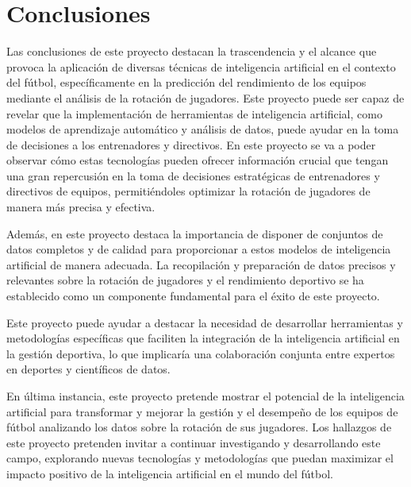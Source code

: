 



\section{Conclusiones}
Las conclusiones de este proyecto destacan la trascendencia y el alcance que provoca la aplicación de diversas técnicas de inteligencia artificial en el contexto del fútbol, específicamente en la predicción del rendimiento de los equipos mediante el análisis de la rotación de jugadores. Este proyecto puede ser capaz de revelar que la implementación de herramientas de inteligencia artificial, como modelos de aprendizaje automático y análisis de datos, puede ayudar en la toma de decisiones a los entrenadores y directivos. En este proyecto se va a poder observar cómo estas tecnologías pueden ofrecer información crucial que tengan una gran repercusión en la toma de decisiones estratégicas de entrenadores y directivos de equipos, permitiéndoles optimizar la rotación de jugadores de manera más precisa y efectiva.

Además, en este proyecto destaca la importancia de disponer de conjuntos de datos completos y de calidad para proporcionar a estos modelos de inteligencia artificial de manera adecuada. La recopilación y preparación de datos precisos y relevantes sobre la rotación de jugadores y el rendimiento deportivo se ha establecido como un componente fundamental para el éxito de este proyecto. 

Este proyecto puede ayudar a destacar la necesidad de desarrollar herramientas y metodologías específicas que faciliten la integración de la inteligencia artificial en la gestión deportiva, lo que implicaría una colaboración conjunta entre expertos en deportes y científicos de datos.

En última instancia, este proyecto pretende mostrar el potencial de la inteligencia artificial para transformar y mejorar la gestión y el desempeño de los equipos de fútbol analizando los datos sobre la rotación de sus jugadores. Los hallazgos de este proyecto pretenden invitar a continuar investigando y desarrollando este campo, explorando nuevas tecnologías y metodologías que puedan maximizar el impacto positivo de la inteligencia artificial en el mundo del fútbol.












